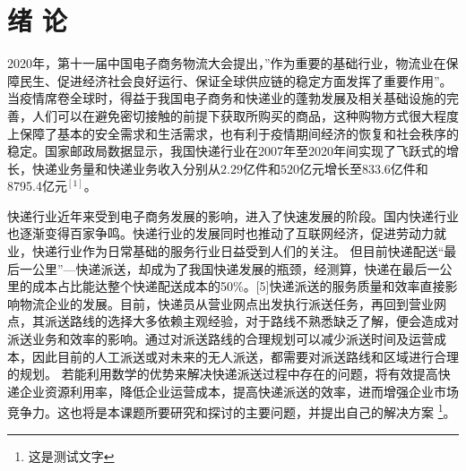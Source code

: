 \clearpage
{}
\setcounter{page}{1}
\setcounter{equation}{0}
\section{绪 \quad 论}
\songti{}
\setlength{\baselineskip}{20pt}
\par 2020年，第十一届中国电子商务物流大会提出，”作为重要的基础行业，物流业在保障民生、促进经济社会良好运行、保证全球供应链的稳定方面发挥了重要作用”。当疫情席卷全球时，得益于我国电子商务和快递业的蓬勃发展及相关基础设施的完善，人们可以在避免密切接触的前提下获取所购买的商品，这种购物方式很大程度上保障了基本的安全需求和生活需求，也有利于疫情期间经济的恢复和社会秩序的稳定。国家邮政局数据显示，我国快递行业在2007年至2020年间实现了飞跃式的增长，快递业务量和快递业务收入分别从$2.29$亿件和$520$亿元增长至833.6亿件和8795.4亿元$^{[1]}$。
\par 快递行业近年来受到电子商务发展的影响，进入了快速发展的阶段。国内快递行业也逐渐变得百家争鸣。快递行业的发展同时也推动了互联网经济，促进劳动力就业，快递行业作为日常基础的服务行业日益受到人们的关注。 但目前快递配送“最后一公里”—快递派送，却成为了我国快递发展的瓶颈，经测算，快递在最后一公里的成本占比能达整个快递配送成本的50\%。[5]快递派送的服务质量和效率直接影响物流企业的发展。目前，快递员从营业网点出发执行派送任务，再回到营业网点，其派送路线的选择大多依赖主观经验，对于路线不熟悉缺乏了解，便会造成对派送业务和效率的影响。通过对派送路线的合理规划可以减少派送时间及运营成本，因此目前的人工派送或对未来的无人派送，都需要对派送路线和区域进行合理的规划。\cite{knuthwebsite} 若能利用数学的优势来解决快递派送过程中存在的问题，将有效提高快递企业资源利用率，降低企业运营成本，提高快递派送的效率，进而增强企业市场竞争力。这也将是本课题所要研究和探讨的主要问题，并提出自己的解决方案 \footnote{这是测试文字}。

